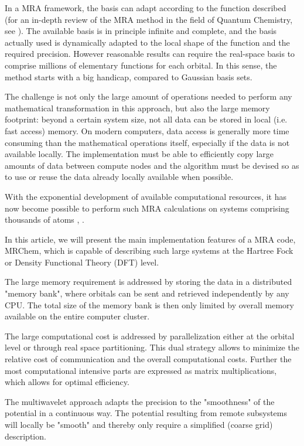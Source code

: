 \documentclass[%
 aip,
 amsmath,amssymb,
 reprint,%
]{revtex4-1}
\begin{document}
In a MRA framework, the basis can adapt according to the function described (for an in-depth review of the MRA method in the field of Quantum Chemistry, see \citep[]{bischoff2019}). The available basis is in principle infinite and complete, and the basis actually used is dynamically adapted to the local shape of the function and the required precision. However reasonable results can require the real-space basis to comprise millions of elementary functions for each orbital. In this sense, the method starts with a big handicap, compared to Gaussian basis sets.

The challenge is not only the large amount of operations needed to perform any mathematical transformation in this approach, but also the large memory footprint: beyond a certain system size, not all data can be stored in local (i.e. fast access) memory. On modern computers, data access is generally more time consuming than the mathematical operations itself, especially if the data is not available locally. The implementation must be able to efficiently copy large amounts of data between compute nodes and the algorithm must be devised so as to use or reuse the data already locally available when possible.

With the exponential development of available computational resources, it has now become possible to perform such MRA calculations on systems comprising 
thousands of atoms \cite{ratcliff2020}, \cite{madness2016}. 

In this article, we will present the main implementation features of a MRA code, MRChem, which is capable of describing such large systems at the Hartree Fock or Density Functional Theory (DFT) level.  

The large memory requirement is addressed by storing the data in a distributed "memory bank", where orbitals can be sent and retrieved independently by any CPU. The total size of the memory bank is then only limited by overall memory available on the entire computer cluster.

The large computational cost is addressed by parallelization either at the orbital level or through real space partitioning. This dual strategy allows to minimize the relative cost of communication and the overall computational costs. Further the most computational intensive parts are expressed as matrix multiplications, which allows for optimal efficiency.  

The multiwavelet approach adapts the precision to the "smoothness" of the potential in a continuous way. The potential resulting from remote subsystems will locally be "smooth" and thereby only require a simplified (coarse grid) description. 
\end{document}
